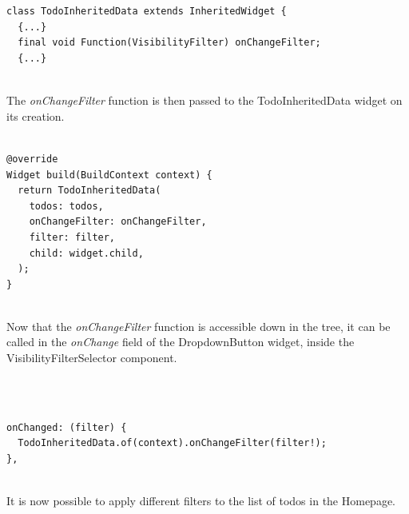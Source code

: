 \mbox{}\\
\begin{code}
\mbox{}\\
\label{code:2.24}
\begin{verbatim}
class TodoInheritedData extends InheritedWidget {
  {...}
  final void Function(VisibilityFilter) onChangeFilter;
  {...}
\end{verbatim}
\end{code}
\mbox{}\\
The \textit{onChangeFilter} function is then passed to the TodoInheritedData widget on its creation.
 \mbox{}\\
\mbox{}\\
\begin{code}
\label{code:2.25}
\begin{verbatim}
@override
Widget build(BuildContext context) {
  return TodoInheritedData(
    todos: todos,
    onChangeFilter: onChangeFilter,
    filter: filter,
    child: widget.child,
  );
}

\end{verbatim}
\end{code}
 \mbox{}\\
Now that the \textit{onChangeFilter   }function is accessible down in the tree, it can be called in the \textit{onChange }field of the DropdownButton widget, inside the VisibilityFilterSelector component.

\mbox{}\\
\mbox{}\\
\begin{code}

\label{code:2.26}
\begin{verbatim}
onChanged: (filter) {
  TodoInheritedData.of(context).onChangeFilter(filter!);
},
\end{verbatim}
\end{code}
\mbox{}\\

It is now possible to apply different filters to the list of todos in the Homepage. 


